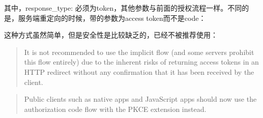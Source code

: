 \documentclass[12pt]{article}
\begin{document}
\begin{Shaded}
\begin{Highlighting}[]
\OperatorTok{://}\OperatorTok{{-}}\OperatorTok{/}
  \OperatorTok{=}
  \OperatorTok{\&}\OperatorTok{=}
  \OperatorTok{\&}\OperatorTok{=}\OperatorTok{://}\OperatorTok{/}\OperatorTok{/}
  \OperatorTok{\&}\OperatorTok{=}
  \OperatorTok{\&}\OperatorTok{=}
\end{Highlighting}
\end{Shaded}

其中，response\_type: 必须为token，其他参数与前面的授权流程一样。不同的是，服务端重定向的时候，带的参数为access token而不是code：

\begin{Shaded}
\begin{Highlighting}[]
\OperatorTok{\#}\OperatorTok{=}\OperatorTok{{-}}
  \OperatorTok{\&}\OperatorTok{=}
  \OperatorTok{\&}\OperatorTok{=}
  \OperatorTok{\&}\OperatorTok{=}
  \OperatorTok{\&}\OperatorTok{=}
\end{Highlighting}
\end{Shaded}

这种方式虽然简单，但是安全性是比较缺乏的，已经不被推荐使用：

\begin{quote}
It is not recommended to use the implicit flow (and some servers prohibit this flow entirely) due to the inherent risks of returning access tokens in an HTTP redirect without any confirmation that it has been received by the client.
\end{quote}

\begin{quote}
Public clients such as native apps and JavaScript apps should now use the authorization code flow with the PKCE extension instead.
\end{quote}
\end{document}
